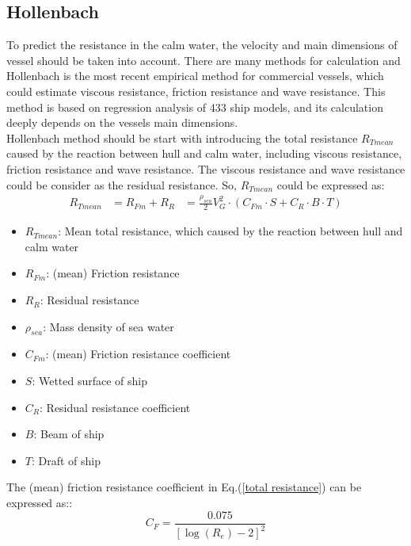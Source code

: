 \subsection{Hollenbach}
\label{sec:Hollenbach}
To predict the resistance in the calm water, the velocity and main dimensions of vessel should be taken into account. There are many methods for calculation and Hollenbach is the most recent empirical method for commercial vessels, which could estimate viscous resistance, friction resistance and wave resistance. This method is based on regression analysis of 433 ship models, and its calculation deeply depends on the vessels main dimensions\cite{HollenbachK1998EstimatingRA}.
\\Hollenbach method should be start with introducing the total resistance $R_{Tmean}$ caused by the reaction between hull and calm water, including viscous resistance, friction resistance and wave resistance. The viscous resistance and wave resistance could be consider as the residual resistance. So, $R_{Tmean}$ could be expressed as:
\begin{equation}
    \begin{aligned}
        R_{Tmean}&=R_{Fm}+R_{R}
        &=\frac{\rho_{sea}}{2} V_{G}^{2} \cdot\left(C_{F m} \cdot S+C_{R} \cdot B \cdot T\right)
    \end{aligned}
    \label{total resistance}
\end{equation}
\begin{itemize}
    \item $R_{Tmean}$: Mean total resistance, which caused by the reaction between hull and calm water
    \item $R_{Fm}$: (mean) Friction resistance
    \item $R_{R}$: Residual resistance
    \item $\rho_{sea}$: Mass density of sea water
    \item $C_{Fm}$: (mean) Friction resistance coefficient
    \item $S$: Wetted surface of ship
    \item $C_{R}$: Residual resistance coefficient
    \item $B$: Beam of ship
    \item $T$: Draft of ship
\end{itemize}
The (mean) friction resistance coefficient in Eq.(\ref{total resistance}) can be expressed as::
\begin{equation}
    C_{F}=\frac{0.075}{\left[\log \left(R_{e}\right)-2\right]^{2}}
\end{equation}
